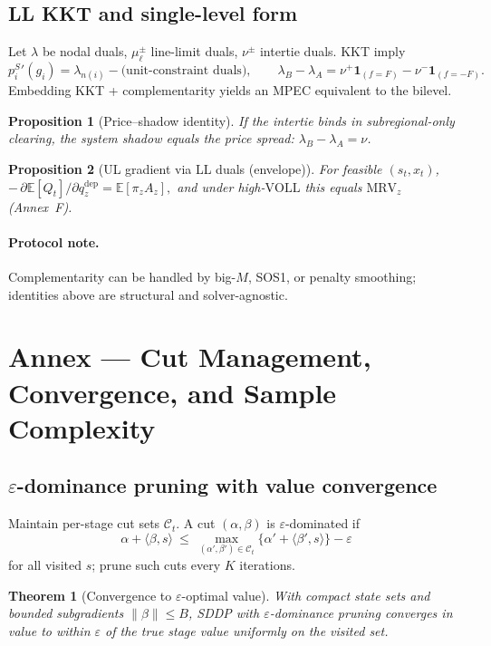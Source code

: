 \documentclass[11pt]{article}
\newcommand{\annexsection}[1]{\section{Annex \thesection{} — #1}}
\newcommand{\VOLL}{\ensuremath{\mathrm{VOLL}}}
\newcommand{\MRV}{\ensuremath{\mathrm{MRV}}}
\numberwithin{equation}{section}
\newtheorem{proposition}{Proposition}[section]
\newtheorem{theorem}{Theorem}[section]
\theoremstyle{definition}
\theoremstyle{remark}
\begin{document}
\subsection{ LL KKT and single-level form}
Let $\lambda$ be nodal duals, $\mu_\ell^{\pm}$ line-limit duals, $\nu^{\pm}$ intertie duals. KKT imply
\[
p_i^{S}{}'(g_i)=\lambda_{n(i)}-\text{(unit-constraint duals)},\qquad
\lambda_B-\lambda_A=\nu^{+}\mathbf{1}_{(f=F)}-\nu^{-}\mathbf{1}_{(f=-F)}.
\]
Embedding KKT + complementarity yields an MPEC equivalent to the bilevel.

\begin{proposition}[Price–shadow identity]
If the intertie binds in subregional-only clearing, the system shadow equals the price spread: $\lambda_B-\lambda_A=\nu$.
\end{proposition}

\begin{proposition}[UL gradient via LL duals (envelope)]
For feasible $(s_t,x_t)$,
\(
-\,\partial \mathbb{E}[Q_t]/\partial q^{\mathrm{dep}}_{z} = \mathbb{E}[\pi_z A_z],
\)
and under high-\VOLL{} this equals $\MRV_z$ (Annex~F).
\end{proposition}

\paragraph{Protocol note.} Complementarity can be handled by big-$M$, SOS1, or penalty smoothing; identities above are structural and solver-agnostic.

\annexsection{Cut Management, Convergence, and Sample Complexity}
\label{annex:R}

\subsection{\texorpdfstring{$\varepsilon$}{epsilon}-dominance pruning with value convergence}
Maintain per-stage cut sets $\mathcal{C}_t$. A cut $(\alpha,\beta)$ is $\varepsilon$-dominated if
\[
\alpha+\langle\beta,s\rangle \ \le\ \max_{(\alpha',\beta')\in\mathcal{C}_t}\{\alpha'+\langle\beta',s\rangle\}-\varepsilon
\]
for all visited $s$; prune such cuts every $K$ iterations.

\begin{theorem}[Convergence to $\varepsilon$-optimal value]
With compact state sets and bounded subgradients $\|\beta\|\le B$, SDDP with $\varepsilon$-dominance pruning converges in value to within $\varepsilon$ of the true stage value uniformly on the visited set.
\end{theorem}
\end{document}
